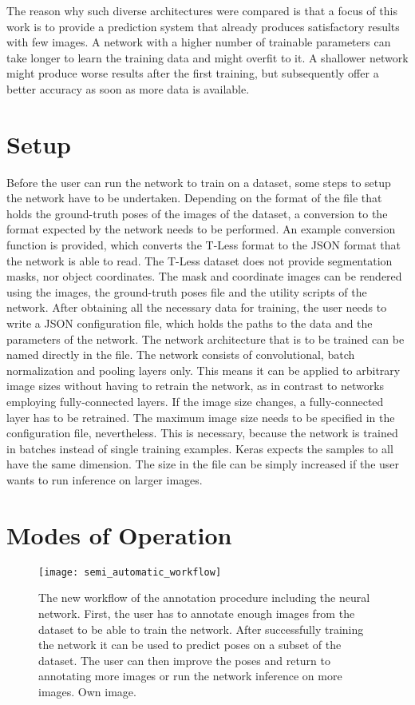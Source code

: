 The reason why such diverse architectures were compared is that a focus of this work is to provide a prediction system that already produces satisfactory results with few images. A network with a higher number of trainable parameters can take longer to learn the training data and might overfit to it. A shallower network might produce worse results after the first training, but subsequently offer a better accuracy  as soon as more data is available.

\section{Setup}

Before the user can run the network to train on a dataset, some steps to setup the network have to be undertaken. Depending on the format of the file that holds the ground-truth poses of the images of the dataset, a conversion to the format expected by the network needs to be performed. An example conversion function is provided, which converts the T-Less format to the JSON format that the network is able to read. The T-Less dataset does not provide segmentation masks, nor object coordinates. The mask and coordinate images can be rendered using the images, the ground-truth poses file and the utility scripts of the network. After obtaining all the necessary data for training, the user needs to write a JSON configuration file, which holds the paths to the data and the parameters of the network. The network architecture that is to be trained can be named directly in the file. The network consists of convolutional, batch normalization and pooling layers only. This means it can be applied to arbitrary image sizes without having to retrain the network, as in contrast to networks employing fully-connected layers. If the image size changes, a fully-connected layer has to be retrained. The maximum image size needs to be specified in the configuration file, nevertheless. This is necessary, because the network is trained in batches instead of single training examples. Keras expects the samples to all have the same dimension. The size in the file can be simply increased if the user wants to run inference on larger images.

\section{Modes of Operation} \label{section:modes_of_operation}

\begin{figure}[!tbp]
	\centering
    \texttt{[image: semi\_automatic\_workflow]}
    \caption{The new workflow of the annotation procedure including the neural network. First, the user has to annotate enough images from the dataset to be able to train the network. After successfully training the network it can be used to predict poses on a subset of the dataset. The user can then improve the poses and return to annotating more images or run the network inference on more images. Own image.}
    	\label{fig:semi_automatic_workflow}
\end{figure}

